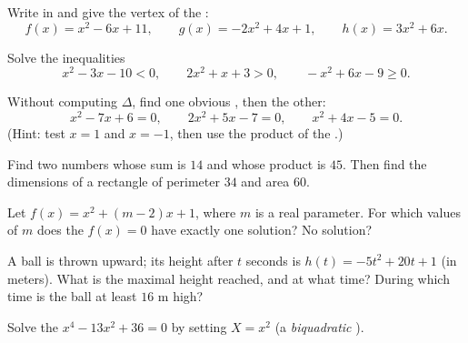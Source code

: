 \begin{exercise}[$\star$]\label{exo:g11:quad:2}
Write in  and give the vertex of the :
\[
f(x) = x^2 - 6x + 11, \qquad
g(x) = -2x^2 + 4x + 1, \qquad
h(x) = 3x^2 + 6x .
\]
\end{exercise}

\begin{exercise}[$\star$]\label{exo:g11:quad:3}
Solve the inequalities
\[
x^2 - 3x - 10 < 0, \qquad
2x^2 + x + 3 > 0, \qquad
-x^2 + 6x - 9 \geq 0 .
\]
\end{exercise}

\begin{exercise}[$\star$]\label{exo:g11:quad:4}
Without computing $\Delta$, find one obvious , then the other:
\[
x^2 - 7x + 6 = 0, \qquad
2x^2 + 5x - 7 = 0, \qquad
x^2 + 4x - 5 = 0 .
\]
(Hint: test $x = 1$ and $x = -1$, then use the product of the .)
\end{exercise}

\begin{exercise}[$\star\star$]\label{exo:g11:quad:5}
Find two numbers whose sum is $14$ and whose product is $45$. Then find the
dimensions of a rectangle of perimeter $34$ and area $60$.
\end{exercise}

\begin{exercise}[$\star\star$]\label{exo:g11:quad:6}
Let $f(x) = x^2 + (m-2)x + 1$, where $m$ is a real parameter. For which
values of $m$ does the  $f(x) = 0$ have exactly one solution? No
solution?
\end{exercise}

\begin{exercise}[$\star\star$]\label{exo:g11:quad:7}
A ball is thrown upward; its height after $t$ seconds is
$h(t) = -5t^2 + 20t + 1$ (in meters). What is the maximal height reached,
and at what time? During which time  is the ball at least $16$ m
high?
\end{exercise}

\begin{exercise}[$\star\star$]\label{exo:g11:quad:8}
Solve the  $x^4 - 13x^2 + 36 = 0$ by setting $X = x^2$
(a \emph{biquadratic} ).
\end{exercise}

